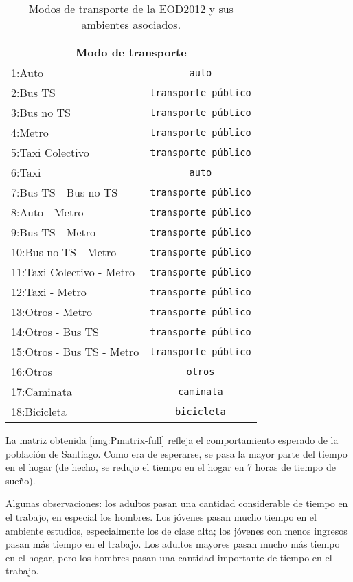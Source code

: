 \begin{table}[h!]
\centering
\begin{tabular}{||l|c||} 
 \hline
 \multicolumn{2}{||c||}{Modo de transporte} \\
 \hline
 1:Auto                        & \texttt{auto}\\
 2:Bus TS                      & \texttt{transporte público}\\
 3:Bus no TS                   & \texttt{transporte público}\\
 4:Metro                       & \texttt{transporte público}\\
 5:Taxi Colectivo              & \texttt{transporte público}\\
 6:Taxi                        & \texttt{auto}\\
 7:Bus TS - Bus no TS          & \texttt{transporte público}\\
 8:Auto - Metro                & \texttt{transporte público}\\
 9:Bus TS - Metro              & \texttt{transporte público}\\
 10:Bus no TS - Metro          & \texttt{transporte público}\\
 11:Taxi Colectivo - Metro     & \texttt{transporte público}\\
 12:Taxi - Metro               & \texttt{transporte público}\\
 13:Otros - Metro              & \texttt{transporte público}\\
 14:Otros - Bus TS             & \texttt{transporte público}\\
 15:Otros - Bus TS - Metro     & \texttt{transporte público}\\
 16:Otros                      & \texttt{otros}\\
 17:Caminata                   & \texttt{caminata}\\
 18:Bicicleta                  & \texttt{bicicleta}\\
 \hline
\end{tabular}
\caption{Modos de transporte de la EOD2012 y sus ambientes asociados.}
\label{table:ambientes-modo-full}
\end{table}

La matriz obtenida \ref{img:Pmatrix-full} refleja el comportamiento esperado de la población de Santiago. Como era de esperarse, se pasa la mayor parte del tiempo en el hogar (de hecho, se redujo el tiempo en el hogar en 7 horas de tiempo de sueño). 

Algunas observaciones: los adultos pasan una cantidad considerable de tiempo en el trabajo, en especial los hombres. Los jóvenes pasan mucho tiempo en el ambiente estudios, especialmente los de clase alta; los jóvenes con menos ingresos pasan más tiempo en el trabajo. Los adultos mayores pasan mucho más tiempo en el hogar, pero los hombres pasan una cantidad importante de tiempo en el trabajo. 

